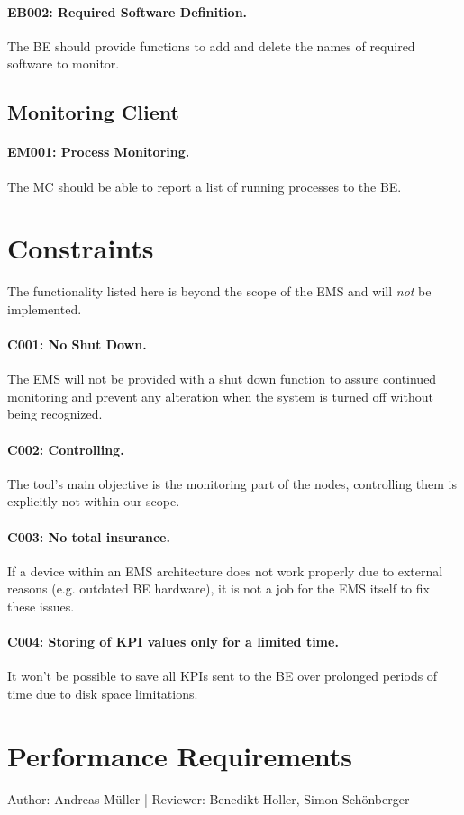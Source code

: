 \documentclass{scrreprt}
\begin{document}
\paragraph{EB002: Required Software Definition.} The BE should provide functions to add and delete the names of required software to monitor.

\subsection{Monitoring Client}
\paragraph{EM001: Process Monitoring.} The MC should be able to report a list of running processes to the BE.

 
\section{Constraints}
The functionality listed here is beyond the scope of the EMS and will \emph{not} be implemented.
\paragraph{C001: No Shut Down.} The EMS will not be provided with a shut down function to assure continued monitoring and prevent any alteration when the system is turned off without being recognized.
\paragraph{C002: Controlling.} The tool's main objective is the monitoring part of the nodes, controlling them is explicitly not within our scope. 
\paragraph{C003: No total insurance.} If a device within an EMS architecture does not work properly due to external reasons (e.g. outdated BE hardware), it is not a job for the EMS itself to fix these issues.
\paragraph{C004: Storing of KPI values only for a limited time.} It won't be possible to save all KPIs sent to the BE over prolonged periods of time due to disk space limitations.

\section{Performance Requirements}
Author: Andreas M\"uller |
Reviewer: Benedikt Holler, Simon Sch\"onberger
\end{document}

